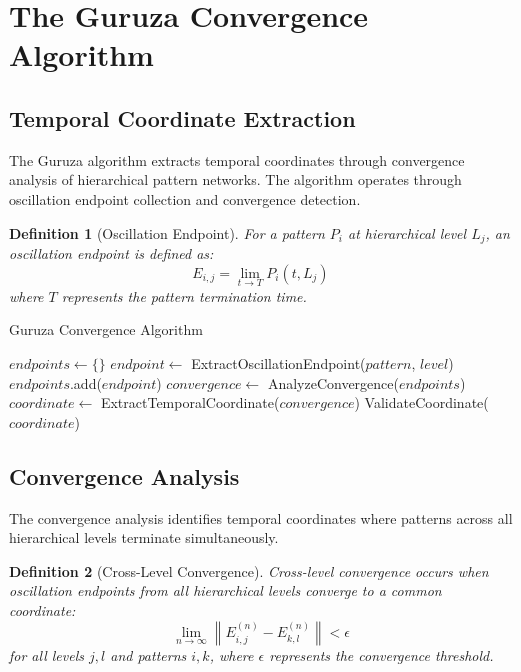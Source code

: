 \documentclass[12pt,a4paper]{article}
\newtheorem{definition}{Definition}
\begin{document}
\section{The Guruza Convergence Algorithm}

\subsection{Temporal Coordinate Extraction}

The Guruza algorithm extracts temporal coordinates through convergence analysis of hierarchical pattern networks. The algorithm operates through oscillation endpoint collection and convergence detection.

\begin{definition}[Oscillation Endpoint]
For a pattern $P_i$ at hierarchical level $L_j$, an oscillation endpoint is defined as:
\begin{equation}
E_{i,j} = \lim_{t \to T} P_i(t, L_j)
\end{equation}
where $T$ represents the pattern termination time.
\end{definition}

\begin{algorithm}
\caption{Guruza Convergence Algorithm}
\begin{algorithmic}
    \State $endpoints \gets \{\}$
            \State $endpoint \gets$ ExtractOscillationEndpoint($pattern$, $level$)
            \State $endpoints$.add($endpoint$)
        \EndFor
    \EndFor
    \State $convergence \gets$ AnalyzeConvergence($endpoints$)
    \State $coordinate \gets$ ExtractTemporalCoordinate($convergence$)
    \State \Return ValidateCoordinate($coordinate$)
\EndProcedure
\end{algorithmic}
\end{algorithm}

\subsection{Convergence Analysis}

The convergence analysis identifies temporal coordinates where patterns across all hierarchical levels terminate simultaneously.

\begin{definition}[Cross-Level Convergence]
Cross-level convergence occurs when oscillation endpoints from all hierarchical levels converge to a common coordinate:
\begin{equation}
\lim_{n \to \infty} \left\| E_{i,j}^{(n)} - E_{k,l}^{(n)} \right\| < \epsilon
\end{equation}
for all levels $j, l$ and patterns $i, k$, where $\epsilon$ represents the convergence threshold.
\end{definition}
\end{document}
